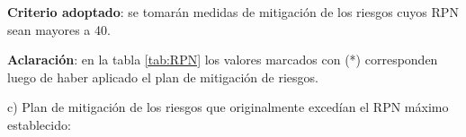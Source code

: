 \documentclass[
11pt, %
codirector, %
]{charter}
\begin{document}
\textbf{Criterio adoptado}: se tomarán medidas de mitigación de los riesgos cuyos RPN sean mayores a 40.

\textbf{Aclaración}: en la tabla \ref{tab:RPN} los valores marcados con (*) corresponden luego de haber aplicado el plan de mitigación de riesgos.





\vspace{0.5cm}

c) Plan de mitigación de los riesgos que originalmente excedían el RPN máximo establecido:
 
\end{document}
